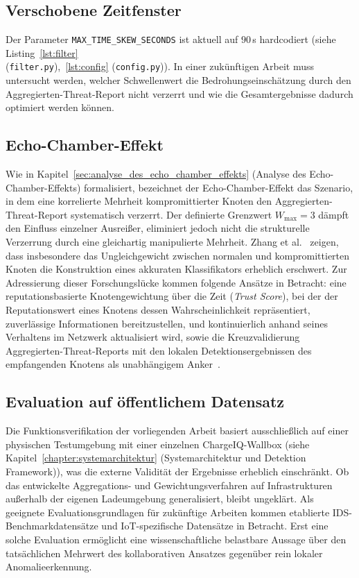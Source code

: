 \subsection{Verschobene Zeitfenster}
Der Parameter \texttt{MAX\_TIME\_SKEW\_SECONDS} ist aktuell auf $90$\,s hardcodiert (siehe Listing~\ref{lst:filter}\\(\texttt{filter.py}),~\ref{lst:config} (\texttt{config.py})). In einer zukünftigen Arbeit muss untersucht werden, welcher Schwellenwert die Bedrohungseinschätzung durch den Aggregierten-Threat-Report nicht verzerrt und wie die Gesamtergebnisse dadurch optimiert werden können. 

\subsection{Echo-Chamber-Effekt}
Wie in Kapitel~\ref{sec:analyse_des_echo_chamber_effekts} (Analyse des Echo-Chamber-Effekts) formalisiert, bezeichnet der Echo-Chamber-Effekt das Szenario, in dem eine korrelierte Mehrheit kompromittierter Knoten den Aggregierten-Threat-Report systematisch verzerrt. Der definierte Grenzwert $W_{\text{max}} = 3$ dämpft den Einfluss einzelner Ausreißer, eliminiert jedoch nicht die strukturelle Verzerrung durch eine gleichartig manipulierte Mehrheit. Zhang et al.~\cite{zhang2022reputation} zeigen, dass insbesondere das Ungleichgewicht zwischen normalen und kompromittierten Knoten die Konstruktion eines akkuraten Klassifikators erheblich erschwert. Zur Adressierung dieser Forschungslücke kommen folgende Ansätze in Betracht: eine reputationsbasierte Knotengewichtung über die Zeit (\textit{Trust Score}), bei der der Reputationswert eines Knotens dessen Wahrscheinlichkeit repräsentiert, zuverlässige Informationen bereitzustellen, und kontinuierlich anhand seines Verhaltens im Netzwerk aktualisiert wird, sowie die Kreuzvalidierung Aggregierten-Threat-Reports mit den lokalen Detektionsergebnissen des empfangenden Knotens als unabhängigem Anker~\cite{zhang2022reputation}.

\subsection{Evaluation auf öffentlichem Datensatz}
Die Funktionsverifikation der vorliegenden Arbeit basiert ausschließlich auf einer physischen Testumgebung mit einer einzelnen ChargeIQ-Wallbox (siehe Kapitel~\ref{chapter:systemarchitektur} (Systemarchitektur und Detektion Framework)), was die externe Validität der Ergebnisse erheblich einschränkt. Ob das entwickelte Aggregations- und Gewichtungsverfahren auf Infrastrukturen außerhalb der eigenen Ladeumgebung generalisiert, bleibt ungeklärt. Als geeignete Evaluationsgrundlagen für zukünftige Arbeiten kommen etablierte IDS-Benchmarkdatensätze und IoT-spezifische Datensätze in Betracht. Erst eine solche Evaluation ermöglicht eine wissenschaftliche belastbare Aussage über den tatsächlichen Mehrwert des kollaborativen Ansatzes gegenüber rein lokaler Anomalieerkennung.